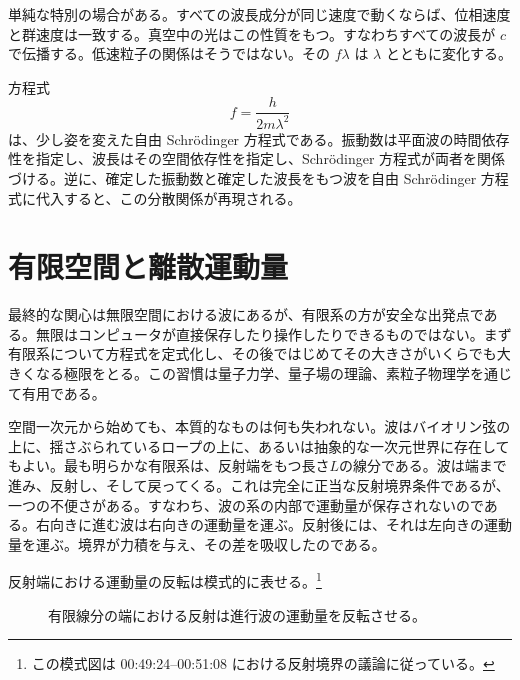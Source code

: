 単純な特別の場合がある。すべての波長成分が同じ速度で動くならば、位相速度と群速度は一致する。真空中の光はこの性質をもつ。すなわちすべての波長が \(c\) で伝播する。低速粒子の関係はそうではない。その \(f\lambda\) は \(\lambda\) とともに変化する。

方程式
\begin{equation}
f=\frac{h}{2m\lambda^2}
\end{equation}
は、少し姿を変えた自由 Schr\"odinger 方程式である。振動数は平面波の時間依存性を指定し、波長はその空間依存性を指定し、Schr\"odinger 方程式が両者を関係づける。逆に、確定した振動数と確定した波長をもつ波を自由 Schr\"odinger 方程式に代入すると、この分散関係が再現される。

\begin{classroomqa}
\end{classroomqa}

\section{有限空間と離散運動量}

最終的な関心は無限空間における波にあるが、有限系の方が安全な出発点である。無限はコンピュータが直接保存したり操作したりできるものではない。まず有限系について方程式を定式化し、その後ではじめてその大きさがいくらでも大きくなる極限をとる。この習慣は量子力学、量子場の理論、素粒子物理学を通じて有用である。

空間一次元から始めても、本質的なものは何も失われない。波はバイオリン弦の上に、揺さぶられているロープの上に、あるいは抽象的な一次元世界に存在してもよい。最も明らかな有限系は、反射端をもつ長さ\(L\)の線分である。波は端まで進み、反射し、そして戻ってくる。これは完全に正当な反射境界条件であるが、一つの不便さがある。すなわち、波の系の内部で運動量が保存されないのである。右向きに進む波は右向きの運動量を運ぶ。反射後には、それは左向きの運動量を運ぶ。境界が力積を与え、その差を吸収したのである。

反射端における運動量の反転は模式的に表せる。\footnote{この模式図は 00:49:24--00:51:08 における反射境界の議論に従っている。}

\begin{figure}[t]
\centering
{}
\caption{有限線分の端における反射は進行波の運動量を反転させる。}
\end{figure}

